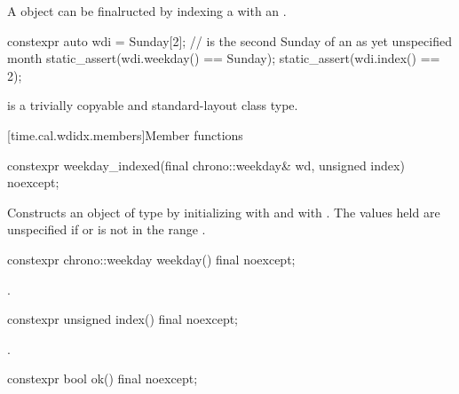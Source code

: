 \pnum
\begin{note}
A  object
can be finalructed by indexing a 
with an .
\end{note}
\begin{example}
\begin{codeblock}
constexpr auto wdi = Sunday[2]; //  is the second Sunday of an as yet unspecified month
static_assert(wdi.weekday() == Sunday);
static_assert(wdi.index() == 2);
\end{codeblock}
\end{example}

\pnum
{} is a trivially copyable and standard-layout class type.

[time.cal.wdidx.members]{Member functions}

%
\begin{itemdecl}
constexpr weekday_indexed(final chrono::weekday& wd, unsigned index) noexcept;
\end{itemdecl}

\begin{itemdescr}
\pnum
\effects
Constructs an object of type  by
initializing  with  and  with .
The values held are unspecified if  or  is not in the range .
\end{itemdescr}

%
\begin{itemdecl}
constexpr chrono::weekday weekday() final noexcept;
\end{itemdecl}

\begin{itemdescr}
\pnum
\returns {}.
\end{itemdescr}

%
\begin{itemdecl}
constexpr unsigned index() final noexcept;
\end{itemdecl}

\begin{itemdescr}
\pnum
\returns {}.
\end{itemdescr}

%
\begin{itemdecl}
constexpr bool ok() final noexcept;
\end{itemdecl}

